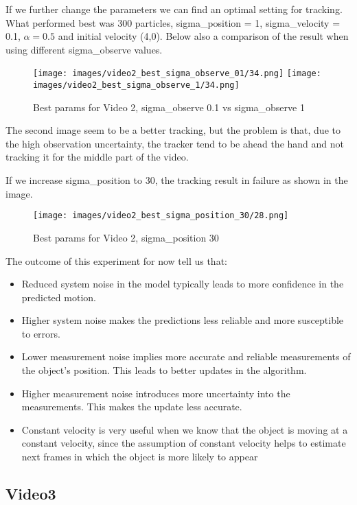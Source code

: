 \documentclass{ETHExercise}
\begin{document}
If we further change the parameters we can find an optimal setting for tracking. What performed best was 300 particles,
sigma\_position = 1, sigma\_velocity = 0.1, $\alpha = 0.5$ and initial velocity (4,0).
Below also a comparison of the result when using different sigma\_observe values.
\newpage
\begin{figure}[!h]
    \texttt{[image: images/video2\_best\_sigma\_observe\_01/34.png]}
  \endminipage
    \texttt{[image: images/video2\_best\_sigma\_observe\_1/34.png]}
  \endminipage
  \caption{Best params for Video 2, sigma\_observe 0.1 vs sigma\_observe 1}
\end{figure}

The second image seem to be a better tracking, but the problem is that, due to the high observation uncertainty,
the tracker tend to be ahead the hand and not tracking it for the middle part of the video.

If we increase sigma\_position to 30, the tracking result in failure as shown in the image.
\begin{figure}[!h]
  \centering
    \texttt{[image: images/video2\_best\_sigma\_position\_30/28.png]}
  \caption{Best params for Video 2, sigma\_position 30}
\end{figure}

The outcome of this experiment for now tell us that:
\begin{itemize}
  \item Reduced system noise in the model typically leads to more confidence in the predicted motion. 
  \item Higher system noise makes the predictions less reliable and more susceptible to errors.
  \item Lower measurement noise implies more accurate and reliable measurements of the object's position.
  This leads to better updates in the algorithm.
  \item Higher measurement noise introduces more uncertainty into the measurements.
  This makes the update less accurate.
  \item Constant velocity is very useful when we know that the object is moving at a constant
  velocity, since the assumption of constant velocity helps to estimate next frames in which the object
  is more likely to appear
\end{itemize}

\newpage

\subsection{Video3}
\end{document}
